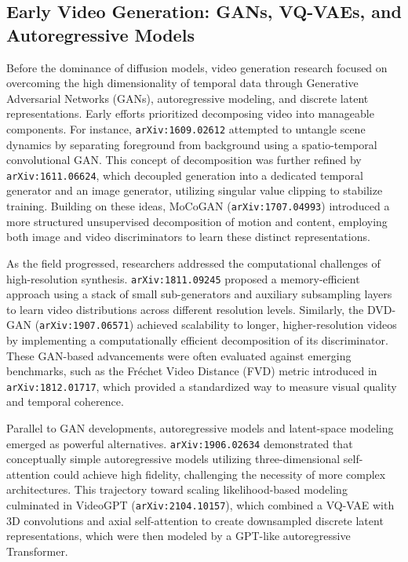 \documentclass[11pt]{article}
\begin{document}
\subsection{Early Video Generation: GANs, VQ-VAEs, and Autoregressive Models}

Before the dominance of diffusion models, video generation research focused on overcoming the high dimensionality of temporal data through Generative Adversarial Networks (GANs), autoregressive modeling, and discrete latent representations. Early efforts prioritized decomposing video into manageable components. For instance, \texttt{arXiv:1609.02612} attempted to untangle scene dynamics by separating foreground from background using a spatio-temporal convolutional GAN. This concept of decomposition was further refined by \texttt{arXiv:1611.06624}, which decoupled generation into a dedicated temporal generator and an image generator, utilizing singular value clipping to stabilize training. Building on these ideas, MoCoGAN (\texttt{arXiv:1707.04993}) introduced a more structured unsupervised decomposition of motion and content, employing both image and video discriminators to learn these distinct representations.

As the field progressed, researchers addressed the computational challenges of high-resolution synthesis. \texttt{arXiv:1811.09245} proposed a memory-efficient approach using a stack of small sub-generators and auxiliary subsampling layers to learn video distributions across different resolution levels. Similarly, the DVD-GAN (\texttt{arXiv:1907.06571}) achieved scalability to longer, higher-resolution videos by implementing a computationally efficient decomposition of its discriminator. These GAN-based advancements were often evaluated against emerging benchmarks, such as the Fréchet Video Distance (FVD) metric introduced in \texttt{arXiv:1812.01717}, which provided a standardized way to measure visual quality and temporal coherence.

Parallel to GAN developments, autoregressive models and latent-space modeling emerged as powerful alternatives. \texttt{arXiv:1906.02634} demonstrated that conceptually simple autoregressive models utilizing three-dimensional self-attention could achieve high fidelity, challenging the necessity of more complex architectures. This trajectory toward scaling likelihood-based modeling culminated in VideoGPT (\texttt{arXiv:2104.10157}), which combined a VQ-VAE with 3D convolutions and axial self-attention to create downsampled discrete latent representations, which were then modeled by a GPT-like autoregressive Transformer.
\end{document}

